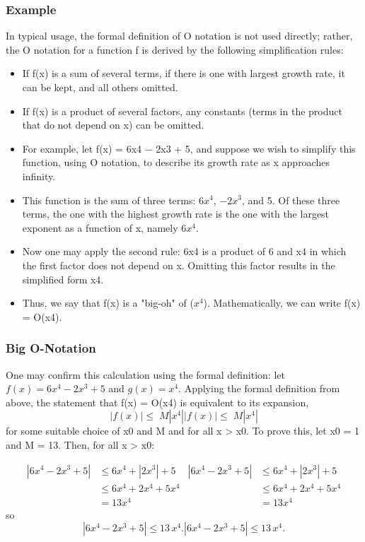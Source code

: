 \documentclass{beamer}
\begin{document}
\begin{frame}
\frametitle{Example}
In typical usage, the formal definition of O notation is not used directly; rather, the O notation for a function f is derived by the following simplification rules:
\begin{itemize}
\item If f(x) is a sum of several terms, if there is one with largest growth rate, it can be kept, and all others omitted.
\item If f(x) is a product of several factors, any constants (terms in the product that do not depend on x) can be omitted.
\end{itemize}
\end{frame}
\begin{frame}
\begin{itemize}
\item For example, let f(x) = 6x4 − 2x3 + 5, and suppose we wish to simplify this function, using O notation, to describe its growth rate as x approaches infinity. 
\item This function is the sum of three terms: $6x^4$, $−2x^3$, and 5. Of these three terms, the one with the highest growth rate is the one with the largest exponent as a function of x, namely $6x^4$. 
\item Now one may apply the second rule: 6x4 is a product of 6 and x4 in which the first factor does not depend on x. Omitting this factor results in the simplified form x4. 
\item Thus, we say that f(x) is a "big-oh" of ($x^4$). Mathematically, we can write f(x) = O(x4). 
\end{itemize}
\end{frame}
\begin{frame}
\frametitle{Big O-Notation}
One may confirm this calculation using the formal definition: let $f(x) = 6x^4 − 2x^3 + 5$ and $g(x) = x^4$. Applying the formal definition from above, the statement that f(x) = O(x4) is equivalent to its expansion,
\[
{\displaystyle |f(x)|\leq \;M|x^{4}|} {\displaystyle |f(x)|\leq \;M|x^{4}|}\]
for some suitable choice of x0 and M and for all x > x0. To prove this, let x0 = 1 and M = 13. Then, for all x > x0:

\[{\displaystyle {\begin{aligned}|6x^{4}-2x^{3}+5|&\leq 6x^{4}+|2x^{3}|+5\\&\leq 6x^{4}+2x^{4}+5x^{4}\\&=13x^{4}\end{aligned}}} {\displaystyle {\begin{aligned}|6x^{4}-2x^{3}+5|&\leq 6x^{4}+|2x^{3}|+5\\&\leq 6x^{4}+2x^{4}+5x^{4}\\&=13x^{4}\end{aligned}}}\]
so
\[
{\displaystyle |6x^{4}-2x^{3}+5|\leq 13\,x^{4}.} |6x^{4}-2x^{3}+5|\leq 13\,x^{4}.
\]
\end{frame}
\end{document}
